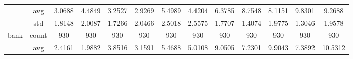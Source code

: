 \begin{table}[htbp]
{\begin{tabular}{rcccccccccccc}
                                                     & avg                                    & 3.0688                                                                             & 4.4849                                                                    & 3.2527                                                                    & \cellcolor[rgb]{ .776,  .937,  .808}\textcolor[rgb]{ 0,  .38,  0}{2.9269} & 5.4989                                        & 4.4204                                      & 6.3785                                         & 8.7548                                         & 8.1151                                         & 9.8301                                         & 9.2688                                         \\
                                                     & std                                    & 1.8148                                                                             & 2.0087                                                                    & 1.7266                                                                    & 2.0466                                                                    & 2.5018                                        & 2.5575                                      & 1.7707                                         & 1.4074                                         & 1.9775                                         & 1.3046                                         & 1.9578                                         \\
                  bank                               & count                                  & 930                                                                                & 930                                                                       & 930                                                                       & 930                                                                       & 930                                           & 930                                         & 930                                            & 930                                            & 930                                            & 930                                            & 930                                            \\
                                                     & avg                                    & 2.4161                                                                             & \cellcolor[rgb]{ .776,  .937,  .808}\textcolor[rgb]{ 0,  .38,  0}{1.9882} & 3.8516                                                                    & 3.1591                                                                    & 5.4688                                        & 5.0108                                      & 9.0505                                         & 7.2301                                         & 9.9043                                         & 7.3892                                         & 10.5312                                        \\

\end{tabular}}
\end{table}
